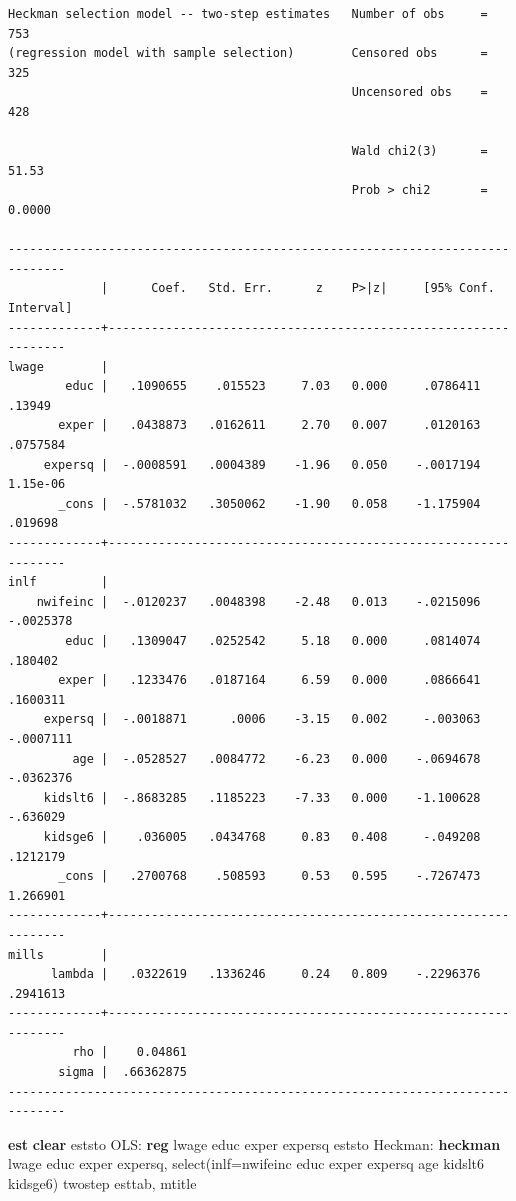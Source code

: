 \documentclass[
]{book}
\newenvironment{Shaded}{\begin{snugshade}}{\end{snugshade}}
\newcommand{\KeywordTok}[1]{\textcolor[rgb]{0.13,0.29,0.53}{\textbf{#1}}}
\newcommand{\NormalTok}[1]{#1}
\begin{document}
\begin{verbatim}
Heckman selection model -- two-step estimates   Number of obs     =        753
(regression model with sample selection)        Censored obs      =        325
                                                Uncensored obs    =        428

                                                Wald chi2(3)      =      51.53
                                                Prob > chi2       =     0.0000

------------------------------------------------------------------------------
             |      Coef.   Std. Err.      z    P>|z|     [95% Conf. Interval]
-------------+----------------------------------------------------------------
lwage        |
        educ |   .1090655    .015523     7.03   0.000     .0786411      .13949
       exper |   .0438873   .0162611     2.70   0.007     .0120163    .0757584
     expersq |  -.0008591   .0004389    -1.96   0.050    -.0017194    1.15e-06
       _cons |  -.5781032   .3050062    -1.90   0.058    -1.175904     .019698
-------------+----------------------------------------------------------------
inlf         |
    nwifeinc |  -.0120237   .0048398    -2.48   0.013    -.0215096   -.0025378
        educ |   .1309047   .0252542     5.18   0.000     .0814074     .180402
       exper |   .1233476   .0187164     6.59   0.000     .0866641    .1600311
     expersq |  -.0018871      .0006    -3.15   0.002     -.003063   -.0007111
         age |  -.0528527   .0084772    -6.23   0.000    -.0694678   -.0362376
     kidslt6 |  -.8683285   .1185223    -7.33   0.000    -1.100628    -.636029
     kidsge6 |    .036005   .0434768     0.83   0.408     -.049208    .1212179
       _cons |   .2700768    .508593     0.53   0.595    -.7267473    1.266901
-------------+----------------------------------------------------------------
mills        |
      lambda |   .0322619   .1336246     0.24   0.809    -.2296376    .2941613
-------------+----------------------------------------------------------------
         rho |    0.04861
       sigma |  .66362875
------------------------------------------------------------------------------
\end{verbatim}

\begin{Shaded}
\begin{Highlighting}[]
\KeywordTok{est} \KeywordTok{clear}
\NormalTok{eststo OLS: }\KeywordTok{reg}\NormalTok{ lwage educ exper expersq    }
\NormalTok{eststo Heckman: }\KeywordTok{heckman}\NormalTok{ lwage educ exper expersq, select(inlf=nwifeinc educ exper expersq age kidslt6 kidsge6) twostep }
\NormalTok{esttab, mtitle}
\end{Highlighting}
\end{Shaded}
\end{document}
